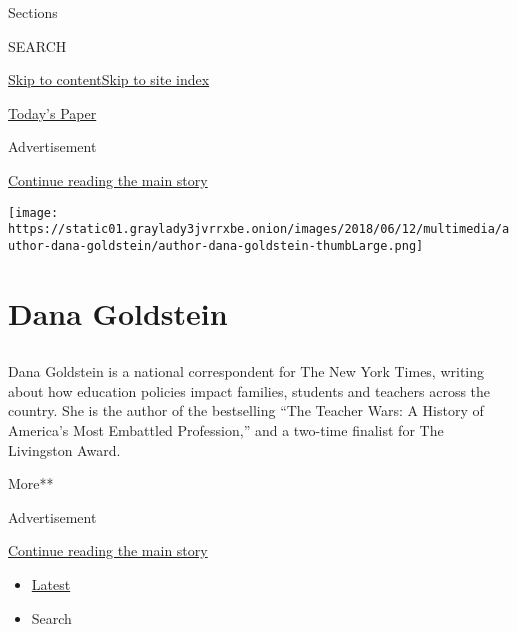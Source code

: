 Sections

SEARCH

\protect\hyperlink{site-content}{Skip to
content}\protect\hyperlink{site-index}{Skip to site index}

\href{https://myaccount.nytimes3xbfgragh.onion/auth/login?response_type=cookie\&client_id=vi}{}

\href{https://www.nytimes3xbfgragh.onion/section/todayspaper}{Today's
Paper}

Advertisement

\protect\hyperlink{after-top}{Continue reading the main story}

\texttt{[image: https://static01.graylady3jvrrxbe.onion/images/2018/06/12/multimedia/author-dana-goldstein/author-dana-goldstein-thumbLarge.png]}

\hypertarget{dana-goldstein}{%
\section{Dana Goldstein}\label{dana-goldstein}}

\subsection{}

Dana Goldstein is a national correspondent for The New York Times,
writing about how education policies impact families, students and
teachers across the country. She is the author of the bestselling ``The
Teacher Wars: A History of America's Most Embattled Profession,'' and a
two-time finalist for The Livingston Award.

More**

Advertisement

\protect\hyperlink{after-mid1}{Continue reading the main story}

\begin{itemize}
\tightlist
\item
  \protect\hyperlink{stream-panel}{Latest}
\item
  Search
\end{itemize}


